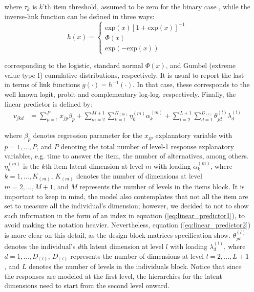 \noindent where $\tau_{k}$ is $k$'th item threshold, assumed to be zero for the binary case \cite{Rabe_et_al_2004a}, while the inverse-link function can be defined in three ways:
%
\begin{equation} \label{eq:response_dich1}
	h(x) = 
	\begin{cases}
		\text{exp}(x)[1 + \text{exp}(x)]^{-1} \\
		\Phi(x)  \\
		\text{exp}(-\text{exp}(x))
	\end{cases}
\end{equation}

\noindent corresponding to the logistic, standard normal $\Phi(x)$, and Gumbel (extreme value type I) cumulative distributions, respectively. It is usual to report the last in terms of link functions $g(\cdot) = h^{-1}(\cdot)$. In that case, these corresponds to the well known logit, probit and complementary log-log, respectively. Finally, the linear predictor is defined by:
%
\begin{equation} \label{eq:linear_predictor1}
	\begin{split}
		v_{jkd} &= \sum_{p=1}^{P} x_{jp} \beta_{p} + \sum_{m=2}^{M+1} \sum_{k=1}^{K_{(m)}} \eta_{k}^{(m)} \alpha_{k}^{(m)} + \sum_{l=2}^{L+1} \sum_{d=1}^{D_{(l)}} \theta_{jd}^{(l)} \lambda_{d}^{(l)}
	\end{split}
\end{equation}

\noindent where $\beta_{p}$ denotes regression parameter for the $x_{jp}$ explanatory variable with $p=1,\dots, P$, and $P$ denoting the total number of level-1 response explanatory variables, e.g. time to answer the item, the number of alternatives, among others. $\eta_{k}^{(m)}$ is the $k$th item latent dimension at level $m$ with loading $\alpha_{k}^{(m)}$, where $k= 1, \dots, K_{(m)}$, $K_{(m)}$ denotes the number of dimensions at level $m=2,\dots, M+1$, and $M$ represents the number of levels in the items block. It is important to keep in mind, the model also contemplates that not all the item are set to measure all the individual's dimension; however, we decided to not to show such information in the form of an index in equation (\ref{eq:linear_predictor1}), to avoid making the notation heavier. Nevertheless, equation (\ref{eq:linear_predictor2}) is more clear on this detail, as the design block matrices specification show. $\theta_{jd}^{(l)}$ denotes the individual's $d$th latent dimension at level $l$ with loading $\lambda_{d}^{(l)}$, where $d=1, \dots, D_{(l)}$, $D_{(l)}$ represents the number of dimensions at level $l=2, \dots, L+1$, and $L$ denotes the number of levels in the individuals block. Notice that since the responses are modeled at the first level, the hierarchies for the latent dimensions need to start from the second level onward.

